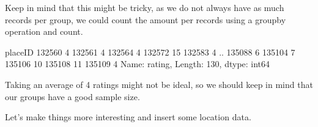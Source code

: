 \documentclass[letterpaper,10pt,english]{jupyterBook}
\begin{document}
\sphinxAtStartPar
Keep in mind that this might be tricky, as we do not always have as much records per group, we could count the amount per records using a groupby operation and count.

\begin{sphinxVerbatim}[commandchars=\\\{\}]
\end{sphinxVerbatim}

\begin{sphinxVerbatim}[commandchars=\\\{\}]
placeID
132560     4
132561     4
132564     4
132572    15
132583     4
          ..
135088     6
135104     7
135106    10
135108    11
135109     4
Name: rating, Length: 130, dtype: int64
\end{sphinxVerbatim}

\sphinxAtStartPar
Taking an average of 4 ratings might not be ideal, so we should keep in mind that our groups have a good sample size.

\sphinxAtStartPar
Let’s make things more interesting and insert some location data.

\begin{sphinxVerbatim}[commandchars=\\\{\}]
  
\end{sphinxVerbatim}
\end{document}
